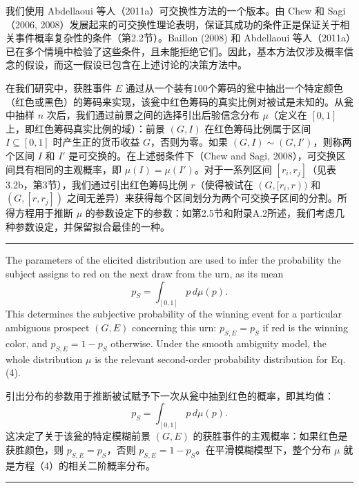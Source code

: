 \documentclass[12pt,a4paper]{article}
\newenvironment{original}
  {\par\vspace{0.5em}\noindent\color{black}\ignorespaces}
  {\par\vspace{0.3em}}
\newenvironment{translation}
  {\par\noindent\color{transblue}\ignorespaces}
  {\par\vspace{0.8em}\hrule\vspace{0.5em}}
\begin{document}
\begin{translation}
我们使用 Abdellaoui 等人（2011a）可交换性方法的一个版本。由 Chew 和 Sagi（2006, 2008）发展起来的可交换性理论表明，保证其成功的条件正是保证关于相关事件概率复杂性的条件（第2.2节）。Baillon (2008) 和 Abdellaoui 等人（2011a）已在多个情境中检验了这些条件，且未能拒绝它们。因此，基本方法仅涉及概率信念的假设，而这一假设已包含在上述讨论的决策方法中。

在我们研究中，获胜事件 $E$ 通过从一个装有100个筹码的瓮中抽出一个特定颜色（红色或黑色）的筹码来实现，该瓮中红色筹码的真实比例对被试是未知的。从瓮中抽样 $n$ 次后，我们通过前景之间的选择引出后验信念分布 $\mu$（定义在 $[0, 1]$ 上，即红色筹码真实比例的域）：前景 $(G, I)$ 在红色筹码比例属于区间 $I \subseteq [0, 1]$ 时产生正的货币收益 $G$，否则为零。如果 $(G, I) \sim (G, I')$，则称两个区间 $I$ 和 $I'$ 是可交换的。在上述弱条件下（Chew and Sagi, 2008），可交换区间具有相同的主观概率，即 $\mu(I) = \mu(I')$。对于一系列区间 $[r_i, r_j]$（见表3.2b，第3节），我们通过引出红色筹码比例 $r$（使得被试在 $(G, [r_i, r))$ 和 $(G, [r, r_j])$ 之间无差异）来获得每个区间划分为两个可交换子区间的分割。所得方程用于推断 $\mu$ 的参数设定下的参数：如第2.5节和附录A.2所述，我们考虑几种参数设定，并保留拟合最佳的一种。
\end{translation}

\begin{original}
The parameters of the elicited distribution are used to infer the probability the subject assigns to red on the next draw from the urn, as its mean
\begin{equation}
p_S = \int_{[0,1]} p\, d\mu(p). \label{eq:subjprob}
\end{equation}
This determines the subjective probability of the winning event for a particular ambiguous prospect $(G, E)$ concerning this urn: $p_{S,E} = p_S$ if red is the winning color, and $p_{S,E} = 1 - p_S$ otherwise. Under the smooth ambiguity model, the whole distribution $\mu$ is the relevant second-order probability distribution for Eq. (4).
\end{original}

\begin{translation}
引出分布的参数用于推断被试赋予下一次从瓮中抽到红色的概率，即其均值：
\begin{equation}
p_S = \int_{[0,1]} p\, d\mu(p).
\end{equation}
这决定了关于该瓮的特定模糊前景 $(G, E)$ 的获胜事件的主观概率：如果红色是获胜颜色，则 $p_{S,E} = p_S$，否则 $p_{S,E} = 1 - p_S$。在平滑模糊模型下，整个分布 $\mu$ 就是方程（4）的相关二阶概率分布。
\end{translation}
\end{document}
